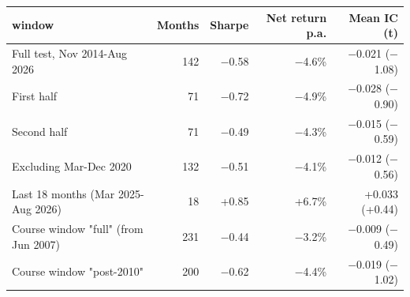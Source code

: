 \begin{tabular}{lrrrr}
\toprule
window & Months & Sharpe & Net return p.a. & Mean IC (t) \\
\midrule
Full test, Nov 2014-Aug 2026 & 142 & $-$0.58 & $-$4.6\% & $-$0.021 ($-$1.08) \\
First half & 71 & $-$0.72 & $-$4.9\% & $-$0.028 ($-$0.90) \\
Second half & 71 & $-$0.49 & $-$4.3\% & $-$0.015 ($-$0.59) \\
Excluding Mar-Dec 2020 & 132 & $-$0.51 & $-$4.1\% & $-$0.012 ($-$0.56) \\
Last 18 months (Mar 2025-Aug 2026) & 18 & +0.85 & +6.7\% & +0.033 (+0.44) \\
Course window "full" (from Jun 2007) & 231 & $-$0.44 & $-$3.2\% & $-$0.009 ($-$0.49) \\
Course window "post-2010" & 200 & $-$0.62 & $-$4.4\% & $-$0.019 ($-$1.02) \\
\bottomrule
\end{tabular}
